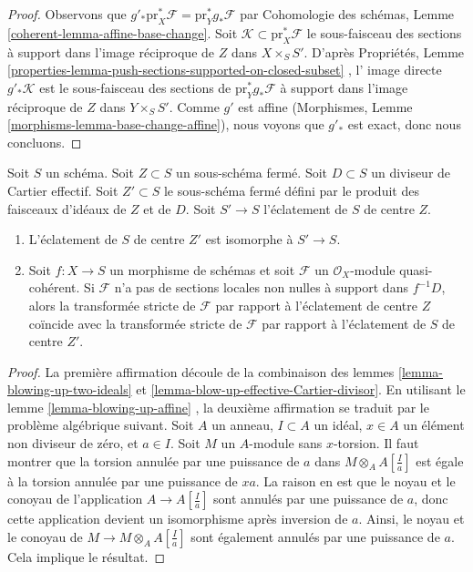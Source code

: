 \begin{proof}
Observons que  $g'_*\text{pr}_X^*\mathcal{F} = \text{pr}_Y^*g_*\mathcal{F}$  par Cohomologie des schémas, Lemme  \ref{coherent-lemma-affine-base-change}. Soit
 $\mathcal{K} \subset \text{pr}_X^*\mathcal{F}$  le sous-faisceau des sections à support dans l'image réciproque de
 $Z$  dans  $X \times_S S'$. D'après Propriétés, Lemme  \ref{properties-lemma-push-sections-supported-on-closed-subset} , l'
image directe  $g'_*\mathcal{K}$  est le sous-faisceau des sections de  $\text{pr}_Y^*g_*\mathcal{F}$ 
à support dans l'image réciproque de  $Z$  dans  $Y \times_S S'$. Comme
 $g'$  est affine (Morphismes, Lemme  \ref{morphisms-lemma-base-change-affine}), nous voyons que
 $g'_*$  est exact, donc nous concluons.
\end{proof}

\begin{lemma}
\label{lemma-strict-transform-different-centers}
Soit  $S$  un schéma. Soit  $Z \subset S$  un sous-schéma fermé. Soit
 $D \subset S$  un diviseur de Cartier effectif. Soit  $Z' \subset S$  le sous-schéma
fermé défini par le produit des faisceaux d'idéaux de  $Z$  et de
 $D$. Soit  $S' \to S$  l'éclatement de  $S$  de centre  $Z$.
\begin{enumerate}
\item L'éclatement de  $S$  de centre  $Z'$  est isomorphe à  $S' \to S$.
\item Soit  $f : X \to S$  un morphisme de schémas et soit  $\mathcal{F}$  un
 $\mathcal{O}_X$-module quasi-cohérent. Si  $\mathcal{F}$  n'a pas de sections locales
non nulles à support dans  $f^{-1}D$, alors la transformée stricte de
 $\mathcal{F}$  par rapport à l'éclatement de centre  $Z$  coïncide avec la
transformée stricte de  $\mathcal{F}$  par rapport à l'éclatement de  $S$  de centre
 $Z'$.
\end{enumerate}
\end{lemma}

\begin{proof}
La première affirmation découle de la combinaison des lemmes  \ref{lemma-blowing-up-two-ideals}  et
 \ref{lemma-blow-up-effective-Cartier-divisor}. En utilisant le lemme  \ref{lemma-blowing-up-affine} , la deuxième affirmation se
traduit par le problème algébrique suivant. Soit  $A$  un anneau,
 $I \subset A$  un idéal,  $x \in A$  un élément non diviseur de zéro, et
 $a \in I$. Soit  $M$  un  $A$-module sans  $x$-torsion. Il faut montrer que la torsion
annulée par une puissance de  $a$ dans  $M \otimes_A A[\frac{I}{a}]$  est égale à la torsion
annulée par une puissance de  $xa$. La raison en est que le noyau et le conoyau de
l'application  $A \to A[\frac{I}{a}]$  sont annulés par une puissance de  $a$, donc cette application devient un isomorphisme après
inversion de  $a$. Ainsi, le noyau et le conoyau de  $M \to M \otimes_A A[\frac{I}{a}]$  sont
également annulés par une puissance de  $a$. Cela implique le résultat.
\end{proof}

